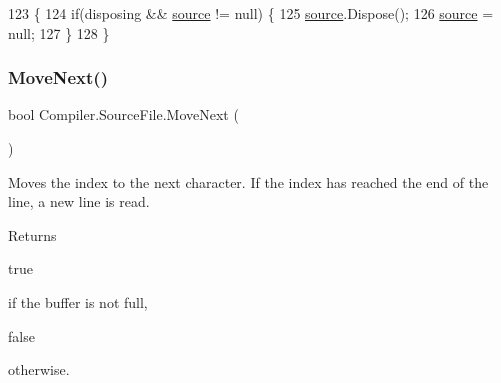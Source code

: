 \begin{DoxyCode}
123                                                                \{
124                     \textcolor{keywordflow}{if}(disposing && \mbox{\hyperlink{class_compiler_1_1_source_file_a46db9fe024d4cf1e282e6afafea8c4b2}{source}} != null) \{
125                         \mbox{\hyperlink{class_compiler_1_1_source_file_a46db9fe024d4cf1e282e6afafea8c4b2}{source}}.Dispose();
126                         \mbox{\hyperlink{class_compiler_1_1_source_file_a46db9fe024d4cf1e282e6afafea8c4b2}{source}} = null;
127                     \}
128                 \}
\end{DoxyCode}
\mbox{\label{class_compiler_1_1_source_file_ad80d0f3a9ead18dce6baad58971838bb}} 
\subsubsection{\texorpdfstring{Move\+Next()}{MoveNext()}}
{\footnotesize\ttfamily bool Compiler.\+Source\+File.\+Move\+Next (\begin{DoxyParamCaption}{ }\end{DoxyParamCaption})}

Moves the index to the next character. If the index has reached the end of the line, a new line is read. \begin{DoxyReturn}{Returns}

\begin{DoxyCode}
\textcolor{keyword}{true} 
\end{DoxyCode}
 if the buffer is not full,
\begin{DoxyCode}
\textcolor{keyword}{false} 
\end{DoxyCode}
 otherwise. 
\end{DoxyReturn}

